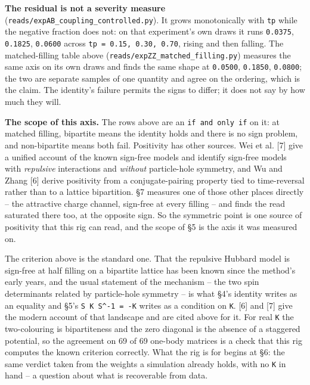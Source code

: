 \documentclass[10pt,letterpaper,twocolumn]{article}
\begin{document}
\textbf{The residual is not a severity measure} (\texttt{reads/\allowbreak{}expAB\_\allowbreak{}coupling\_\allowbreak{}controlled.\allowbreak{}py}). It grows
monotonically with \texttt{tp} while the negative fraction does not: on that experiment's own draws it
runs \texttt{0.\allowbreak{}0375}, \texttt{0.\allowbreak{}1825}, \texttt{0.\allowbreak{}0600} across \texttt{tp\ =\allowbreak{}\ 0.\allowbreak{}15,\allowbreak{}\ 0.\allowbreak{}30,\allowbreak{}\ 0.\allowbreak{}70}, rising and then falling. The
matched-filling table above (\texttt{reads/\allowbreak{}expZZ\_\allowbreak{}matched\_\allowbreak{}filling.\allowbreak{}py}) measures the same axis on its own
draws and finds the same shape at \texttt{0.\allowbreak{}0500}, \texttt{0.\allowbreak{}1850}, \texttt{0.\allowbreak{}0800}; the two are separate samples of one
quantity and agree on the ordering, which is the claim. The identity's failure permits the signs to
differ; it does not say
by how much they will.

\textbf{The scope of this axis.} The rows above are an \texttt{if\ and\ only\ if} on it: at matched filling,
bipartite means the identity holds and there is no sign problem, and non-bipartite means both fail.
Positivity has other sources. Wei et al. {[}7{]} give a unified account of the known sign-free models
and
identify sign-free models with \emph{repulsive} interactions and \emph{without} particle-hole symmetry, and
Wu and Zhang {[}6{]} derive positivity from a conjugate-pairing property tied to time-reversal rather
than to a lattice bipartition. §7 measures one of those other places directly -- the attractive
charge channel, sign-free at every filling -- and finds the read saturated there too, at the
opposite sign. So the symmetric point is one source of positivity that this rig can read, and the
scope of §5 is the axis it was measured on.

The criterion above is the standard one. That the repulsive Hubbard model is sign-free at half
filling on a bipartite lattice has been known since the method's early years, and the usual
statement of the mechanism -- the two spin determinants related by particle-hole symmetry -- is
what §4's identity writes as an equality and §5's \texttt{S\ K\ S\^{}-{}\allowbreak{}1\ =\allowbreak{}\ -{}\allowbreak{}K} writes as a condition on \texttt{K}.
{[}6{]} and {[}7{]} give the modern account of that landscape and are cited above for it. For real \texttt{K} the
two-colouring is bipartiteness and the zero diagonal is the absence of a staggered potential, so
the agreement on 69 of 69 one-body matrices is a check that this rig computes the known criterion
correctly. What the rig is for begins at §6: the same verdict taken from the weights a simulation
already holds, with no \texttt{K} in hand -- a question about what is recoverable from data.
\end{document}
